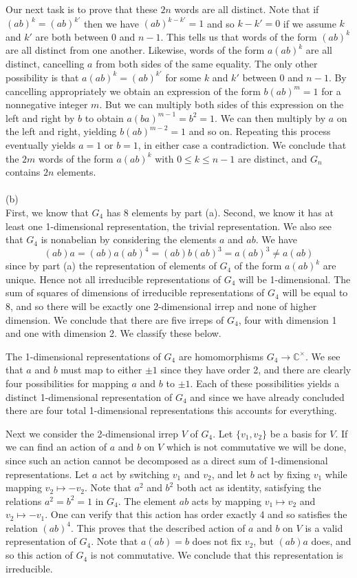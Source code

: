 \documentclass[11pt]{article}
\newcommand{\C}{\mathbb{C}}
\begin{document}
Our next task is to prove that these $2n$ words are all distinct. Note that if $(ab)^k = (ab)^{k'}$ then we have $(ab)^{k-k'} = 1$ and so $k-k' = 0$ if we assume $k$ and $k'$ are both between $0$ and $n-1$. This tells us that words of the form $(ab)^k$ are all distinct from one another. Likewise, words of the form $a(ab)^k$ are all distinct, cancelling $a$ from both sides of the same equality. The only other possibility is that $a(ab)^k = (ab)^{k'}$ for some $k$ and $k'$ between 0 and $n-1$. By cancelling appropriately we obtain an expression of the form $b(ab)^m = 1$ for a nonnegative integer $m$. But we can multiply both sides of this expression on the left and right by $b$ to obtain $a(ba)^{m-1} = b^2 = 1$. We can then multiply by $a$ on the left and right, yielding $b(ab)^{m-2}  = 1$ and so on. Repeating this process eventually yields $a=1$ or $b=1$, in either case a contradiction. We conclude that the $2m$ words of the form $a(ab)^k$ with $0\le k \le n-1$ are distinct, and $G_n$ contains $2n$ elements.\\\\
(b)\\
First, we know that $G_4$ has 8 elements by part (a). Second, we know it has at least one 1-dimensional representation, the trivial representation. We also see that $G_4$ is nonabelian by considering the elements $a$ and $ab$. We have \[
(ab)a = (ab)a(ab)^4 = (ab)b(ab)^3 = a(ab)^3 \neq a(ab)
\]
since by part (a) the representation of elements of $G_4$ of the form $a(ab)^k$ are unique. Hence not all irreducible representations of $G_4$ will be 1-dimensional. The sum of squares of dimensions of irreducible representations of $G_4$ will be equal to 8, and so there will be exactly one 2-dimensional irrep and none of higher dimension. We conclude that there are five irreps of $G_4$, four with dimension 1 and one with dimension 2. We classify these below.

The 1-dimensional representations of $G_4$ are homomorphisms $G_4\to \C^{\times}$. We see that $a$ and $b$ must map to either $\pm 1$ since they have order 2, and there are clearly four possibilities for mapping $a$ and $b$ to $\pm 1$. Each of these possibilities yields a distinct 1-dimensional representation of $G_4$ and since we have already concluded there are four total 1-dimensional representations this accounts for everything.

Next we consider the 2-dimensional irrep $V$ of $G_4$. Let $\{v_1,v_2\}$ be a basis for $V$. If we can find an action of $a$ and $b$ on $V$ which is not commutative we will be done, since such an action cannot be decomposed as a direct sum of 1-dimensional representations. Let $a$ act by switching $v_1$ and $v_2$, and let $b$ act by fixing $v_1$ while mapping $v_2\mapsto -v_2$. Note that $a^2$ and $b^2$ both act as identity, satisfying the relations $a^2=b^2=1$ in $G_4$. The element $ab$ acts by mapping $v_1\mapsto v_2$ and $v_2\mapsto -v_1$. One can verify that this action has order exactly 4 and so satisfies the relation $(ab)^4$. This proves that the described action of $a$ and $b$ on $V$ is a valid representation of $G_4$. Note that $a(ab) = b$ does not fix $v_2$, but $(ab) a$ does, and so this action of $G_4$ is not commutative. We conclude that this representation is irreducible. 
\end{document}
